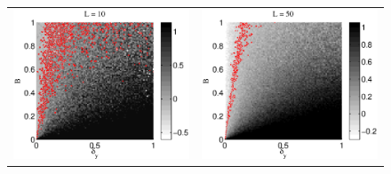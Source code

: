 \documentclass[a4paper,11pt,twocolumn]{article}
\begin{document}
\begin{figure}[ht]
\begin{tabular}{cc}
\includegraphics[scale=0.35]{SimpleIRexample_diffLpart1.eps} &
\includegraphics[scale=0.35]{SimpleIRexample_diffLpart2.eps} \\

\end{tabular}
\end{figure}
\end{document}
